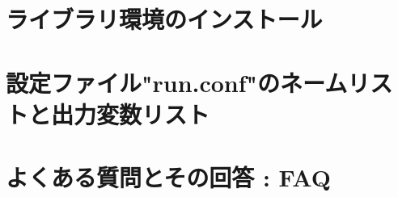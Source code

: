 \documentclass[a4paper]{jreport}
\begin{document}
\begin{appendix}
\chapter{ライブラリ環境のインストール} \label{achap:env_setting}

\chapter{設定ファイル"run.conf"のネームリストと出力変数リスト} \label{achap:namelist}

%
%
\chapter{よくある質問とその回答 : FAQ} \label{achap:practice}


%
\end{appendix}

\ClearWallPaper

\end{document}
